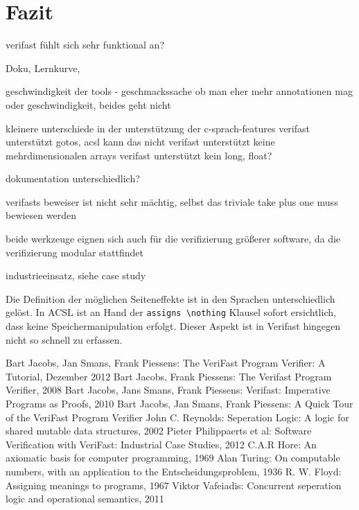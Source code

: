﻿\chapter{Fazit}

verifast fühlt sich sehr funktional an?

Doku, Lernkurve, 

geschwindigkeit der tools - geschmackssache ob man eher mehr annotationen mag oder geschwindigkeit, beides geht nicht


kleinere unterschiede in der unterstützung der c-sprach-features
	verifast unterstützt gotos, acsl kann das nicht
	verifast unterstützt keine mehrdimensionalen arrays
	verifast unterstützt kein long, float?
	
dokumentation unterschiedlich?

verifasts beweiser ist nicht sehr mächtig, selbst das triviale take plus one muss bewiesen werden
	
beide werkzeuge eignen sich auch für die verifizierung größerer software, da die verifizierung modular stattfindet

industrieeinsatz, siehe case study

Die Definition der möglichen Seiteneffekte ist in den Sprachen unterschiedlich gelöst. In ACSL
ist an Hand der \lstinline{assigns \nothing} Klausel sofort ersichtlich, dass keine Speichermanipulation
erfolgt. Dieser Aspekt ist in Verifast hingegen nicht so schnell zu erfassen.

\begin{thebibliography}{}
 Bart Jacobs, Jan Smans, Frank Piessens: The VeriFast Program Verifier: A Tutorial, Dezember 2012
 Bart Jacobs, Frank Piessens: The Verifast Program Verifier, 2008
 Bart Jacobs, Jans Smans, Frank Piessens: Verifast: Imperative Programs as Proofs, 2010
 Bart Jacobs, Jan Smans, Frank Piessens: A Quick Tour of the VeriFast Program Verifier
 John C. Reynolds: Seperation Logic: A logic for shared mutable data structures, 2002
 Pieter Philippaerts et al: Software Verification with VeriFast: Industrial Case Studies, 2012
 C.A.R Hore: An axiomatic basis for computer programming, 1969
 Alan Turing: On computable numbers, with an application to the Entscheidungsproblem, 1936
 R. W. Floyd: Assigning meanings to programs, 1967
 Viktor Vafeiadis: Concurrent seperation logic and operational semantics, 2011
\end{thebibliography}